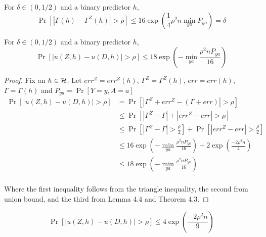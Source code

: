 \begin{lemma}
	For $\delta \in (0,1/2)$ and a binary predictor $h$,
	$$\Pr[|\Gamma(h) - \Gamma^Z(h)|>\rho ] \leq 16 \exp(\frac{1}{4}\rho^2n
	\min_{ya}{P_{ya}}) = \delta$$
\end{lemma}

\begin{lemma}
	For $\delta \in (0,1/2)$ and a binary predictor $h$,
	$$\Pr[|u(Z,h) - u(D,h)| > \rho] \leq 18\exp(-\min_{ya}{\frac{\rho^2 n
			P_{ya}}{16}})$$
\end{lemma}
\begin{proof}
	Fix an $h \in \mathcal{H}$. Let $err^Z = err^Z(h)$, $\Gamma^Z = \Gamma^Z(h)$, $err = err(h)$, $\Gamma = \Gamma(h)$ and $P_{ya} = \Pr[Y=y, A=a]$
	\begin{align*}
	\Pr[|u(Z,h) - u(D,h)| > \rho] & = \Pr[|\Gamma^Z + err^Z - (\Gamma +err) | > \rho]\\
	&\leq \Pr[|\Gamma^Z - \Gamma|  + |err^Z - err| > \rho]\\
	&\leq \Pr[|\Gamma^Z - \Gamma|> \frac{\rho}{2}]  + \Pr[|err^Z - err| > \frac{\rho}{2}]\\
	&\leq 16\exp(-\min_{ya}{\frac{\rho^2 n P_{ya}}{16}}) + 2\exp(\frac{-2\rho^2n}{4})\\
	&\leq 18\exp(-\min_{ya}{\frac{\rho^2 n P_{ya}}{16}})\\	
	\end{align*}
	
	Where the first inequality follows from the triangle inequality, the second from union bound, and the third from Lemma 4.4 and Theorem 4.3.
\end{proof}

$$\Pr[|u(Z,h) - u(D,h)| > \rho] \leq 4\exp(\frac{-2\rho^2n}{9})$$

